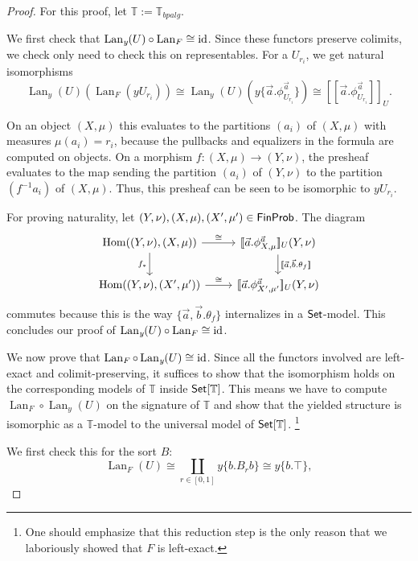 \documentclass[a4paper]{amsproc}
\theoremstyle{plain}
\theoremstyle{definition}
\theoremstyle{remark}
\numberwithin{equation}{section}
\newcommand{\id}{\textup{id}}
\DeclareMathOperator{\Hom}{Hom}
\newcommand{\y}{\textit{y}}
\DeclareMathOperator{\Lan}{Lan}
\newcommand{\Set}{\textup{\textsf{Set}}}
\newcommand{\FinProb}{\textup{\textsf{FinProb}}}
\newcommand{\ldoub}{[\![}
\newcommand{\rdoub}{]\!]}
\begin{document}
\begin{proof}
For this proof, let $\mathbb{T} := \mathbb{T}_{bpalg}$.

We first check that $\Lan_{\y}(U) \circ \Lan_F \cong \id$. Since these functors preserve colimits, we check only need to check this on representables. For a $U_{r_i}$, we get natural isomorphisms 
\begin{equation*}
\Lan_{\y}(U)(\Lan_F(\y U_{r_i}))
\cong \Lan_{\y}(U)(\y \{\vec{a} . \phi^{\vec{a}}_{U_{r_i}} \})
\cong \ldoub \vec{a} . \phi^{\vec{a}}_{U_{r_i}} \rdoub_U .
\end{equation*}

On an object $(X,\mu)$ this evaluates to the partitions $(a_i)$ of $(X,\mu)$ with measures $\mu(a_i) = r_i$, because the pullbacks and equalizers in the formula are computed on objects. On a morphism $f: (X,\mu) \to (Y,\nu)$, the presheaf evaluates to the map sending the partition $(a_i)$ of $(Y,\nu)$ to the partition $(f^{-1}a_i)$ of $(X,\mu)$. Thus, this presheaf can be seen to be isomorphic to $\y U_{r_i}$.

For proving naturality, let $(Y,\nu), (X,\mu), (X',\mu') \in \FinProb$. The diagram
\[
\begin{tikzcd}
    {\Hom((Y,\nu),(X,\mu))} \arrow[r, "\cong"] \arrow[d, "f_*"'] & {\ldoub \vec{a} . \phi^{\vec{a}}_{X,\mu} \rdoub_U (Y,\nu)} \arrow[d, "{\ldoub \vec{a},\vec{b} . \theta_f \rdoub}"] \\
    {\Hom((Y,\nu),(X',\mu'))} \arrow[r, "\cong"]                 & {\ldoub \vec{a} . \phi^{\vec{a}}_{X',\mu'} \rdoub_U (Y,\nu)}
\end{tikzcd}
\]
commutes because this is the way $\{\vec{a},\vec{b} . \theta_f \}$ internalizes in a $\Set$-model. This concludes our proof of $\Lan_{\y}(U) \circ \Lan_F \cong \id$.

We now prove that $\Lan_F \circ \Lan_{\y}(U) \cong \id$. Since all the functors involved are left-exact and colimit-preserving, it suffices to show that the isomorphism holds on the corresponding models of $\mathbb{T}$ inside $\Set[\mathbb{T}]$. This means we have to compute $\Lan_F \circ \Lan_{\y}(U)$ on the signature of $\mathbb{T}$ and show that the yielded structure is isomorphic as a $\mathbb{T}$-model to the universal model of $\Set[\mathbb{T}]$. \footnote{One should emphasize that this reduction step is the only reason that we laboriously showed that $F$ is left-exact.}

We first check this for the sort $B$:
\begin{equation}\label{lan_on_sort}
\Lan_F(U) \cong \coprod_{r \in [0,1]} \y \{b . B_r b\} \cong \y \{b . \top\}, \tag{*}
\end{equation}


\end{proof}
\end{document}
